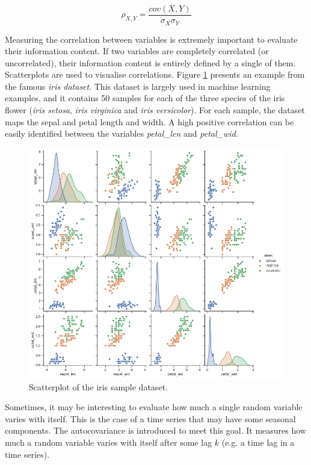 \begin{equation}
\rho_{X,Y}=\frac{cov(X,Y)}{\sigma_X\sigma_Y}
\label{eq_correlation}
\end{equation}

Measuring the correlation between variables is extremely important to evaluate their information content. If two variables are completely correlated (or uncorrelated), their information content is entirely defined by a single of them. Scatterplots are used to visualise correlations. Figure \ref{fig_irisCorrelation} presents an example from the famous \textit{iris dataset}. This dataset is largely used in machine learning examples, and it contains 50 samples for each of the three species of the iris flower (\textit{iris setosa}, \textit{iris virginica} and \textit{iris versicolor}). For each sample, the dataset maps the sepal and petal length and width. A high positive correlation can be easily identified between the variables \textit{petal\_len} and \textit{petal\_wid}.

\begin{figure}[hbt!]
\centering
\includegraphics[width=1\textwidth]{SectionLetsMath/elemStat_figures/fig_irisCorrelation.png}
\captionsetup{type=figure}
\caption{Scatterplot of the iris sample dataset.}
\label{fig_irisCorrelation}
\end{figure}

Sometimes, it may be interesting to evaluate how much a single random variable varies with itself. This is the case of a time series that may have some seasonal components. The autocovariance is introduced to meet this goal. It measures how much a random variable varies with itself after some lag $k$ (e.g. a time lag in a time series).

